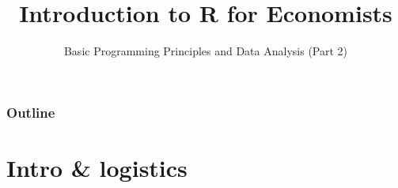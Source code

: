 \documentclass{beamer}
\title
	{Introduction to R for Economists}
\subtitle[Part 2]
	{Basic Programming Principles and Data Analysis (Part 2)
	}
\begin{document}
\begin{frame}
  \titlepage
\end{frame}


\begin{frame}[allowframebreaks]
 \frametitle{Outline}
 \tableofcontents%
\end{frame}

















\section{Intro \& logistics}
\end{document}
